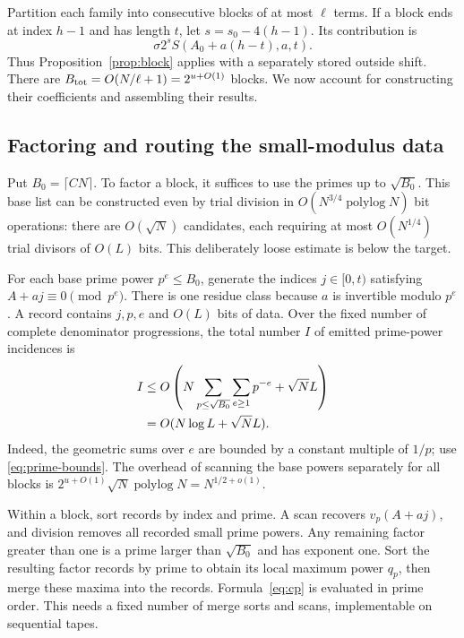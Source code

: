 \documentclass[11pt]{article}
\numberwithin{equation}{section}
\theoremstyle{definition}
\begin{document}
Partition each family into consecutive blocks of at most $\ell$
terms. If a block ends at index $h-1$ and has length $t$, let
$s=s_0-4(h-1)$. Its contribution is
\begin{equation}\label{eq:block-alignment}
 \sigma 2^s S(A_0+a(h-t),a,t).
\end{equation}
Thus Proposition~\ref{prop:block} applies with a separately
stored outside shift. There are
$B_{\rm tot}=O(N/\ell+1)=2^{u+O(1)}$ blocks.
We now account for constructing their coefficients and assembling
their results.

\subsection{Factoring and routing the small-modulus data}
\label{sec:routing}

Put $B_0=\lceil CN\rceil$. To factor a block, it suffices to
use the primes up to $\sqrt{B_0}$. This base list can be
constructed even by trial division in
$O(N^{3/4}\operatorname{polylog}N)$ bit operations: there are
$O(\sqrt N)$ candidates, each requiring at most $O(N^{1/4})$
trial divisors of $O(L)$ bits. This deliberately loose estimate
is below the target.

For each base prime power $p^e\le B_0$, generate the indices
$j\in[0,t)$ satisfying $A+aj\equiv0\pmod{p^e}$.
There is one residue class because $a$ is invertible modulo
$p^e$. A record contains $j,p,e$ and $O(L)$ bits of data.
Over the fixed number of complete denominator progressions,
the total number $I$ of emitted prime-power incidences is
\begin{align}\label{eq:incidences}
 I
 &\le O\left(N\sum_{p\le\sqrt{B_0}}\sum_{e\ge1}p^{-e}
             +\sqrt N L\right) \notag\\
 &=O(N\log L+\sqrt N L).
\end{align}
Indeed, the geometric sums over $e$ are bounded by a constant
multiple of $1/p$; use \eqref{eq:prime-bounds}.
The overhead of scanning the base powers separately for all
blocks is $2^{u+O(1)}\sqrt N\operatorname{polylog}N
=N^{1/2+o(1)}$.

Within a block, sort records by index and prime. A scan recovers
$v_p(A+aj)$, and division removes all recorded small prime
powers. Any remaining factor greater than one is a prime
larger than $\sqrt{B_0}$ and has exponent one.
Sort the resulting factor records by prime to obtain its local
maximum power $q_p$, then merge these maxima into the records.
Formula~\eqref{eq:cp} is evaluated in prime order. This needs
a fixed number of merge sorts and scans, implementable on
sequential tapes.
\end{document}
